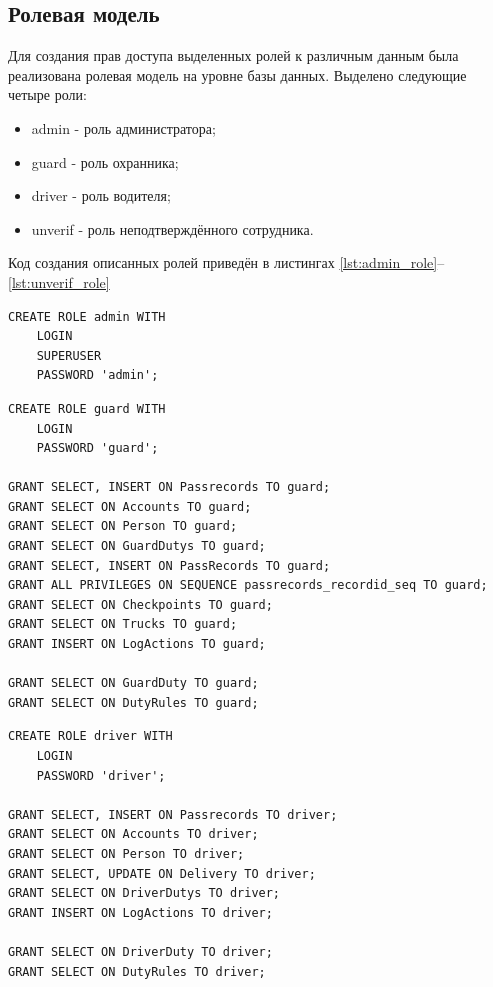 \subsection{Ролевая модель}
Для создания прав доступа выделенных ролей к различным данным была реализована ролевая модель на уровне базы данных. Выделено следующие четыре роли:
\begin{itemize}
	\item admin - роль администратора;
	\item guard - роль охранника;
	\item driver - роль водителя;
	\item unverif - роль неподтверждённого сотрудника.
\end{itemize}

Код создания описанных ролей приведён в листингах \ref{lst:admin_role}--\ref{lst:unverif_role}

\begin{lstlisting}[caption = {Релизация роли admin}, label=lst:admin_role]
CREATE ROLE admin WITH
	LOGIN
	SUPERUSER
	PASSWORD 'admin';
\end{lstlisting}

\begin{lstlisting}[caption = {Релизация роли guard}, label=lst:guard_role]
CREATE ROLE guard WITH
	LOGIN
	PASSWORD 'guard';

GRANT SELECT, INSERT ON Passrecords TO guard;
GRANT SELECT ON Accounts TO guard;
GRANT SELECT ON Person TO guard;
GRANT SELECT ON GuardDutys TO guard;
GRANT SELECT, INSERT ON PassRecords TO guard;
GRANT ALL PRIVILEGES ON SEQUENCE passrecords_recordid_seq TO guard;
GRANT SELECT ON Checkpoints TO guard;
GRANT SELECT ON Trucks TO guard;
GRANT INSERT ON LogActions TO guard;

GRANT SELECT ON GuardDuty TO guard;
GRANT SELECT ON DutyRules TO guard;
\end{lstlisting}

\begin{lstlisting}[caption = {Релизация роли driver}, label=lst:driver_role]
CREATE ROLE driver WITH
	LOGIN
	PASSWORD 'driver';

GRANT SELECT, INSERT ON Passrecords TO driver;
GRANT SELECT ON Accounts TO driver;
GRANT SELECT ON Person TO driver;
GRANT SELECT, UPDATE ON Delivery TO driver;
GRANT SELECT ON DriverDutys TO driver;
GRANT INSERT ON LogActions TO driver;

GRANT SELECT ON DriverDuty TO driver;
GRANT SELECT ON DutyRules TO driver;
\end{lstlisting}


